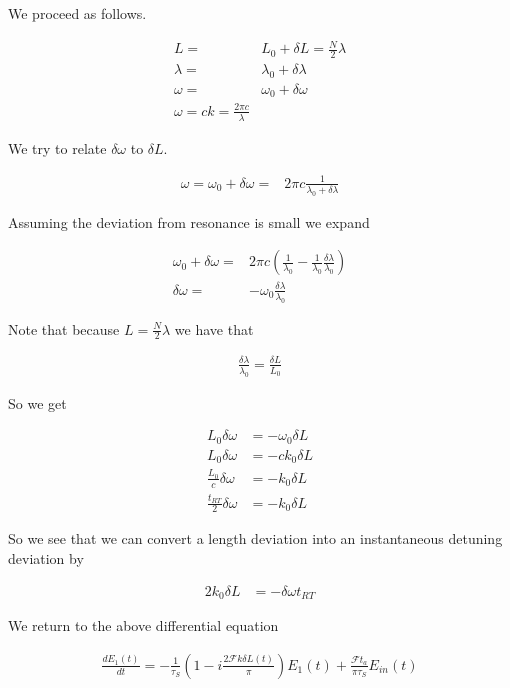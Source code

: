 \documentclass[12pt]{article}
\begin{document}
We proceed as follows.

\begin{align}
L =& L_0 + \delta L = \frac{N}{2}\lambda\\
\lambda =& \lambda_0 + \delta \lambda\\
\omega =& \omega_0 + \delta \omega\\
\omega = ck = \frac{2\pi c}{\lambda}
\end{align}

We try to relate $\delta \omega$ to $\delta L$.

\begin{align}
\omega = \omega_0 + \delta \omega =& 2\pi c \frac{1}{\lambda_0 + \delta \lambda}
\end{align}

Assuming the deviation from resonance is small we expand

\begin{align}
\omega_0 + \delta \omega =&2\pi c \left(\frac{1}{\lambda_0} - \frac{1}{\lambda_0}\frac{\delta \lambda}{\lambda_0} \right)\\
\delta \omega =& -\omega_0 \frac{\delta \lambda}{\lambda_0}
\end{align}

Note that because $L = \frac{N}{2}\lambda$ we have that

\begin{align}
\frac{\delta \lambda}{\lambda_0} = \frac{\delta L}{L_0}
\end{align}

So we get

\begin{align}
L_0 \delta \omega &= -\omega_0 \delta L\\
L_0 \delta \omega &= -c k_0 \delta L\\
\frac{L_0}{c} \delta \omega  &= -k_0 \delta L\\
\frac{t_{RT}}{2}\delta \omega &= -k_0 \delta L
\end{align}

So we see that we can convert a length deviation into an instantaneous detuning deviation by

\begin{align}
2k_0 \delta L &= - \delta\omega t_{RT}
\end{align}

We return to the above differential equation

\begin{align}
\frac{dE_1(t)}{dt} = -\frac{1}{\tau_S}\left(1 - i\frac{2\mathcal{F}k\delta L(t)}{\pi}\right)E_1(t) + \frac{\mathcal{F}t_a}{\pi\tau_S} E_{in}(t)
\end{align}
\end{document}
